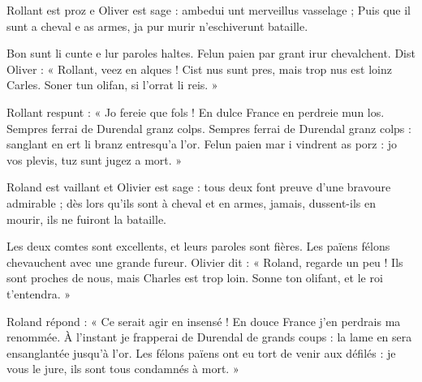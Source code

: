 \documentclass[12pt]{article}
\begin{document}
	



Rollant est proz e Oliver est sage : %
ambedui unt merveillus vasselage ; Puis que il sunt a cheval e as armes, ja pur murir n'eschiverunt bataille.

Bon sunt li cunte e lur paroles haltes. Felun paien par grant irur chevalchent.
Dist Oliver : « Rollant, veez en alques ! Cist nus sunt pres, mais trop nus est loinz Carles. Soner tun olifan, si l'orrat li reis. »

Rollant respunt : « Jo fereie que fols ! En dulce France en perdreie mun los. Sempres ferrai de Durendal granz colps.
Sempres ferrai de Durendal granz colps : sanglant en ert li branz entresqu'a l'or. Felun paien mar i vindrent as porz : jo vos plevis, tuz sunt jugez a mort. »






Roland est vaillant et Olivier est sage : tous deux font preuve d'une bravoure admirable ; dès lors qu'ils sont à cheval et en armes, jamais, dussent-ils en mourir, ils ne fuiront la bataille.


Les deux comtes sont excellents, et leurs paroles sont fières. Les païens félons chevauchent avec une grande fureur. Olivier dit : « Roland, regarde un peu ! Ils sont proches de nous, mais Charles est trop loin. Sonne ton olifant, et le roi t'entendra. »

Roland répond : « Ce serait agir en insensé ! En douce France j'en perdrais ma renommée. À l'instant je frapperai de Durendal de grands coups : la lame en sera ensanglantée jusqu'à l'or. Les félons païens ont eu tort de venir aux défilés : je vous le jure, ils sont tous condamnés à mort. »

\end{document}
